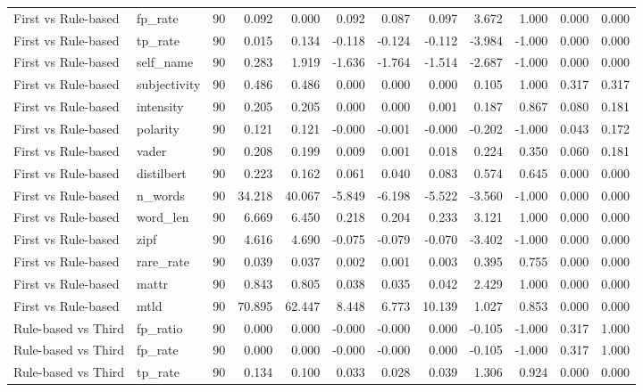 \documentclass[10pt]{article}
\begin{document}
{\begin{longtable}{llrrrrrrrrrr}
First vs Rule-based & fp\_rate & 90 & 0.092 & 0.000 & 0.092 & 0.087 & 0.097 & 3.672 & 1.000 & 0.000 & 0.000 \\
First vs Rule-based & tp\_rate & 90 & 0.015 & 0.134 & -0.118 & -0.124 & -0.112 & -3.984 & -1.000 & 0.000 & 0.000 \\
First vs Rule-based & self\_name & 90 & 0.283 & 1.919 & -1.636 & -1.764 & -1.514 & -2.687 & -1.000 & 0.000 & 0.000 \\
First vs Rule-based & subjectivity & 90 & 0.486 & 0.486 & 0.000 & 0.000 & 0.000 & 0.105 & 1.000 & 0.317 & 0.317 \\
First vs Rule-based & intensity & 90 & 0.205 & 0.205 & 0.000 & 0.000 & 0.001 & 0.187 & 0.867 & 0.080 & 0.181 \\
First vs Rule-based & polarity & 90 & 0.121 & 0.121 & -0.000 & -0.001 & -0.000 & -0.202 & -1.000 & 0.043 & 0.172 \\
First vs Rule-based & vader & 90 & 0.208 & 0.199 & 0.009 & 0.001 & 0.018 & 0.224 & 0.350 & 0.060 & 0.181 \\
First vs Rule-based & distilbert & 90 & 0.223 & 0.162 & 0.061 & 0.040 & 0.083 & 0.574 & 0.645 & 0.000 & 0.000 \\
First vs Rule-based & n\_words & 90 & 34.218 & 40.067 & -5.849 & -6.198 & -5.522 & -3.560 & -1.000 & 0.000 & 0.000 \\
First vs Rule-based & word\_len & 90 & 6.669 & 6.450 & 0.218 & 0.204 & 0.233 & 3.121 & 1.000 & 0.000 & 0.000 \\
First vs Rule-based & zipf & 90 & 4.616 & 4.690 & -0.075 & -0.079 & -0.070 & -3.402 & -1.000 & 0.000 & 0.000 \\
First vs Rule-based & rare\_rate & 90 & 0.039 & 0.037 & 0.002 & 0.001 & 0.003 & 0.395 & 0.755 & 0.000 & 0.000 \\
First vs Rule-based & mattr & 90 & 0.843 & 0.805 & 0.038 & 0.035 & 0.042 & 2.429 & 1.000 & 0.000 & 0.000 \\
First vs Rule-based & mtld & 90 & 70.895 & 62.447 & 8.448 & 6.773 & 10.139 & 1.027 & 0.853 & 0.000 & 0.000 \\
Rule-based vs Third & fp\_ratio & 90 & 0.000 & 0.000 & -0.000 & -0.000 & 0.000 & -0.105 & -1.000 & 0.317 & 1.000 \\
Rule-based vs Third & fp\_rate & 90 & 0.000 & 0.000 & -0.000 & -0.000 & 0.000 & -0.105 & -1.000 & 0.317 & 1.000 \\
Rule-based vs Third & tp\_rate & 90 & 0.134 & 0.100 & 0.033 & 0.028 & 0.039 & 1.306 & 0.924 & 0.000 & 0.000 \\

\end{longtable}}
\end{document}
